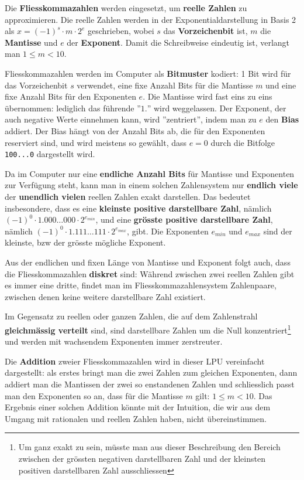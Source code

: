 \documentclass{article}
\begin{document}
Die \textbf{Fliesskommazahlen} werden eingesetzt, um \textbf{reelle Zahlen} zu approximieren. Die reelle Zahlen werden in der Exponentialdarstellung in Basis 2 als \(x = (-1)^s \cdot m \cdot 2^e\) geschrieben, wobei \(s\) das \textbf{Vorzeichenbit} ist, \(m\) die \textbf{Mantisse} und \(e\) der \textbf{Exponent}. Damit die Schreibweise eindeutig ist, verlangt man \(1 \leq m < 10\).

Fliesskommazahlen werden im Computer als \textbf{Bitmuster} kodiert: 1 Bit wird für das Vorzeichenbit \(s\) verwendet, eine fixe Anzahl Bits für die Mantisse \(m\) und eine fixe Anzahl Bits für den Exponenten \(e\). Die Mantisse wird fast eins zu eins übernommen: lediglich das führende ''\(1.\)'' wird weggelassen. Der Exponent, der auch negative Werte einnehmen kann, wird ''zentriert'', indem man zu \(e\) den \textbf{Bias} addiert. Der Bias hängt von der Anzahl Bits ab, die für den Exponenten reserviert sind, und wird meistens so gewählt, dass \(e = 0\) durch die Bitfolge \texttt{100...0} dargestellt wird.

Da im Computer nur eine \textbf{endliche Anzahl Bits} für Mantisse und Exponenten zur Verfügung steht, kann man in einem solchen Zahlensystem nur \textbf{endlich viele} der \textbf{unendlich vielen} reellen Zahlen exakt darstellen. Das bedeutet insbesondere, dass es eine \textbf{kleinste positive darstellbare Zahl}, nämlich \((-1)^0 \cdot 1.000\ldots000 \cdot 2^{e_{min}}\), und eine \textbf{grösste positive darstellbare Zahl}, nämlich \((-1)^0 \cdot 1.111\ldots111 \cdot 2^{e_{max}}\), gibt. Die Exponenten \(e_{min}\) und \(e_{max}\) sind der kleinste, bzw der grösste mögliche Exponent.

Aus der endlichen und fixen Länge von Mantisse und Exponent folgt auch, dass die Fliesskommazahlen \textbf{diskret} sind: Während zwischen zwei reellen Zahlen gibt es immer eine dritte, findet man im Fliesskommazahlensystem Zahlenpaare, zwischen denen keine weitere darstellbare Zahl existiert.

Im Gegensatz zu reellen oder ganzen Zahlen, die auf dem Zahlenstrahl \textbf{gleichmässig verteilt} sind, sind darstellbare Zahlen um die Null konzentriert\footnote{Um ganz exakt zu sein, müsste man aus dieser Beschreibung den Bereich zwischen der grössten negativen darstellbaren Zahl und der kleinsten positiven darstellbaren Zahl ausschliessen} und werden mit wachsendem Exponenten immer zerstreuter.

Die \textbf{Addition} zweier Fliesskommazahlen wird in dieser LPU vereinfacht dargestellt: als erstes bringt man die zwei Zahlen zum gleichen Exponenten, dann addiert man die Mantissen der zwei so enstandenen Zahlen und schliesslich passt man den Exponenten so an, dass für die Mantisse \(m\) gilt: \(1 \leq m < 10\). Das Ergebnis einer solchen Addition könnte mit der Intuition, die wir aus dem Umgang mit rationalen und reellen Zahlen haben, nicht übereinstimmen.
\end{document}

